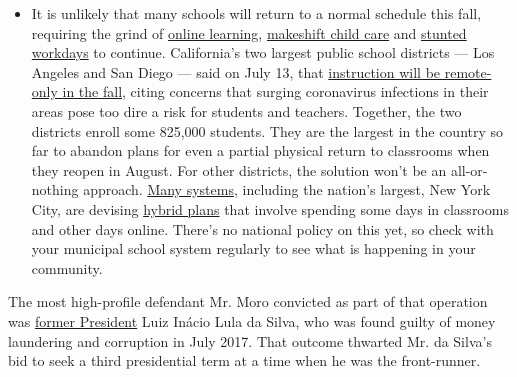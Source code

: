 \begin{itemize}
  \begin{itemize}
  \tightlist
  \item
    It is unlikely that many schools will return to a normal schedule
    this fall, requiring the grind of
    \href{https://www.nytimes.com/2020/06/05/us/coronavirus-education-lost-learning.html?action=click\&pgtype=Article\&state=default\&region=MAIN_CONTENT_3\&context=storylines_faq}{online
    learning},
    \href{https://www.nytimes.com/2020/05/29/us/coronavirus-child-care-centers.html?action=click\&pgtype=Article\&state=default\&region=MAIN_CONTENT_3\&context=storylines_faq}{makeshift
    child care} and
    \href{https://www.nytimes.com/2020/06/03/business/economy/coronavirus-working-women.html?action=click\&pgtype=Article\&state=default\&region=MAIN_CONTENT_3\&context=storylines_faq}{stunted
    workdays} to continue. California's two largest public school
    districts --- Los Angeles and San Diego --- said on July 13, that
    \href{https://www.nytimes.com/2020/07/13/us/lausd-san-diego-school-reopening.html?action=click\&pgtype=Article\&state=default\&region=MAIN_CONTENT_3\&context=storylines_faq}{instruction
    will be remote-only in the fall}, citing concerns that surging
    coronavirus infections in their areas pose too dire a risk for
    students and teachers. Together, the two districts enroll some
    825,000 students. They are the largest in the country so far to
    abandon plans for even a partial physical return to classrooms when
    they reopen in August. For other districts, the solution won't be an
    all-or-nothing approach.
    \href{https://bioethics.jhu.edu/research-and-outreach/projects/eschool-initiative/school-policy-tracker/}{Many
    systems}, including the nation's largest, New York City, are
    devising
    \href{https://www.nytimes.com/2020/06/26/us/coronavirus-schools-reopen-fall.html?action=click\&pgtype=Article\&state=default\&region=MAIN_CONTENT_3\&context=storylines_faq}{hybrid
    plans} that involve spending some days in classrooms and other days
    online. There's no national policy on this yet, so check with your
    municipal school system regularly to see what is happening in your
    community.
  \end{itemize}
\end{itemize}

The most high-profile defendant Mr. Moro convicted as part of that
operation was
\href{https://www.nytimes.com/2018/04/07/world/americas/brazil-lula-surrenders-luiz-inacio-lula-da-silva-.html?action=click\&module=RelatedCoverage\&pgtype=Article\&region=Footer}{former
President} Luiz Inácio Lula da Silva, who was found guilty of money
laundering and corruption in July 2017. That outcome thwarted Mr. da
Silva's bid to seek a third presidential term at a time when he was the
front-runner.

